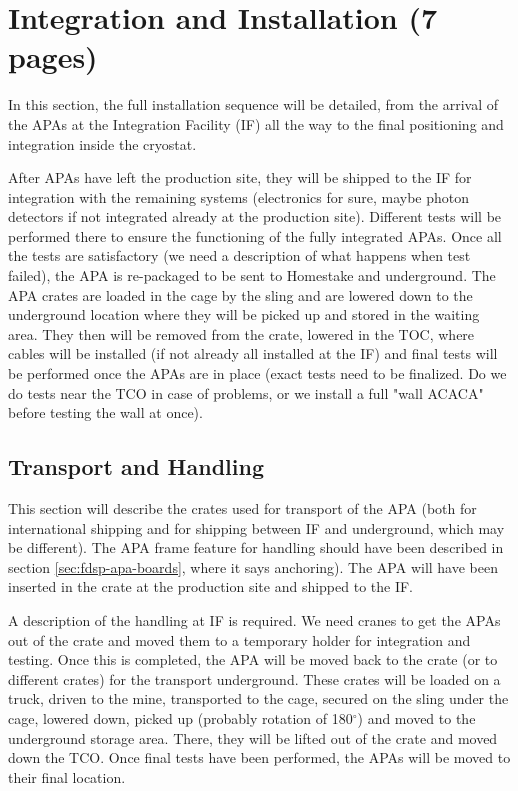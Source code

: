 \section{Integration and Installation (7 pages)}
\label{sec:fdsp-apa-install}

In this section, the full installation sequence will be detailed, from the arrival of the APAs at the Integration Facility (IF) all the way to the final positioning and integration inside the cryostat. 

After APAs have left the production site, they will be shipped to the IF for integration with the remaining systems (electronics for sure, maybe photon detectors if not integrated already at the production site). Different tests will be performed there to ensure the functioning of the fully integrated APAs. Once all the tests are satisfactory (we need a description of what happens when test failed), the APA is re-packaged to be sent to Homestake and underground. The APA crates are loaded in the cage by the sling and are lowered down to the underground location where they will be picked up and stored in the waiting area. They then will be removed from the crate, lowered in the TOC, where cables will be installed (if not already all installed at the IF) and final tests will be performed once the APAs are in place (exact tests need to be finalized. Do we do tests near the TCO in case of problems, or we install a full "wall ACACA" before testing the wall at once).

\subsection{Transport and Handling}
\label{sec:fdsp-apa-install-transport}

This section will describe the crates used for transport of the APA (both for international shipping and for shipping between IF and underground, which may be different). The APA frame feature for handling should have been described in section \ref{sec:fdsp-apa-boards}, where it says anchoring). The APA will have been inserted in the crate at the production site and shipped to the IF.

A description of the handling at IF is required. We need cranes to get the APAs out of the crate and moved them to a temporary holder for integration and testing. Once this is completed, the APA will be moved back to the crate (or to different crates) for the transport underground. These crates will be loaded on a truck, driven to the mine, transported to the cage, secured on the sling under the cage, lowered down, picked up (probably rotation of 180$^{\circ}$) and moved to the underground storage area. There, they will be lifted out of the crate and moved down the TCO. Once final tests have been performed, the APAs will be moved to their final location.

